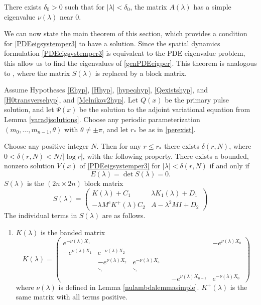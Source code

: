 \documentclass[thesis.tex]{subfiles}
\begin{document}
\begin{lemma}\label{nulambdalemmasimple}
There exists $\delta_0 > 0$ such that for $|\lambda| < \delta_0$, the matrix $A(\lambda)$ has a simple eigenvalue $\nu(\lambda)$ near 0.
\end{lemma}

We can now state the main theorem of this section, which provides a condition for \cref{PDEeigsystemper3} to have a solution. Since the spatial dynamics formulation \cref{PDEeigsystemper3} is equivalent to the PDE eigenvalue problem, this allow us to find the eigenvalues of \cref{genPDEeigper}. This theorem is analogous to \cite[Theorem 2]{Sandstede1998}, where the matrix $S(\lambda)$ is replaced by a block matrix.

\begin{theorem}\label{blockmatrixtheorem}
Assume Hypotheses \ref{Ehyp}, \ref{Hhyp}, \ref{hypeqhyp}, \ref{Qexistshyp}, and \ref{H0transversehyp}, and \ref{Melnikov2hyp}. Let $Q(x)$ be the primary pulse solution, and let $\Psi(x)$ be the solution to the adjoint variational equation from Lemma \ref{varadjsolutions}. Choose any periodic parameterization $(m_0, \dots, m_{n-1}, \theta)$ with $\theta \neq \pm \pi$, and let $r_*$ be as in \cref{perexist}. 

Choose any positive integer $N$. Then for any $r \leq r_*$ there exists $\delta(r,N)$, where $0 < \delta(r,N) < N/|\log r|$, with the following property. There exists a bounded, nonzero solution $V(x)$ of \cref{PDEeigsystemper3} for $|\lambda| < \delta(r,N)$ if and only if
\begin{equation}\label{blockmatrixcond}
E(\lambda) = \det S(\lambda) = 0.
\end{equation}
$S(\lambda)$ is the $(2n \times 2n)$ block matrix
\begin{equation}\label{blockeq}
S(\lambda) = 
\begin{pmatrix}
K(\lambda) + C_1 & \lambda K_1(\lambda) + D_1 \\
-\lambda M^c K^+(\lambda) C_2 & A - \lambda^2 MI + D_2
\end{pmatrix}
\end{equation}
The individual terms in $S(\lambda)$ are as follows.

\begin{enumerate}
\item $K(\lambda)$ is the banded matrix
\begin{equation}
K(\lambda) = 
\begin{pmatrix}
e^{-\nu(\lambda)X_1} & & & & & -e^{\nu(\lambda)X_0} \\
-e^{\nu(\lambda)X_1} & e^{-\nu(\lambda)X_2} \\
& -e^{\nu(\lambda)X_2} & e^{-\nu(\lambda)X_3} \\
& \ddots & \ddots & &&  \\
& & & & -e^{\nu(\lambda)X_{n-1}} & e^{-\nu(\lambda)X_0} 
\end{pmatrix}
\end{equation}
where $\nu(\lambda)$ is defined in Lemma \ref{nulambdalemmasimple}. $K^+(\lambda)$ is the same matrix with all terms positive.


\end{enumerate}
\end{theorem}
\end{document}

